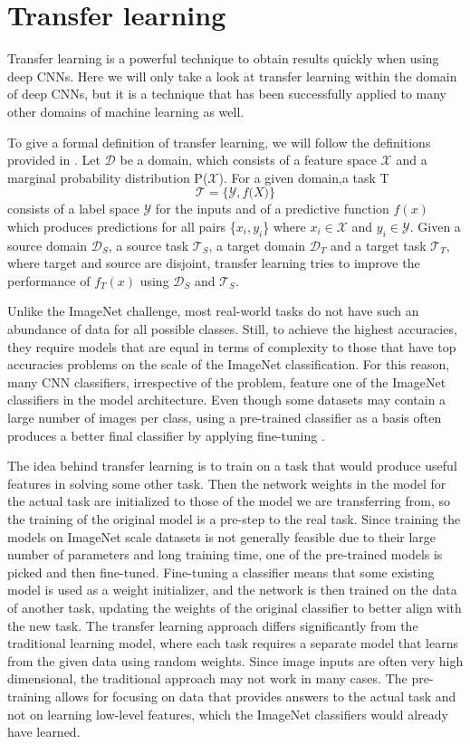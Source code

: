 \section{Transfer learning}
Transfer learning is a powerful technique to obtain results quickly when using deep CNNs. Here we will only take a look at transfer learning within the domain of deep CNNs, but it is a technique that has been successfully applied to many other domains of machine learning as well.

To give a formal definition of transfer learning, we will follow the definitions provided in \citep{transferSurvey2010}.
Let $\mathcal{D}$ be a domain, which consists of a feature space $\mathcal{X}$ and a marginal probability distribution P($\mathcal{X}$).
For a given domain,a task T \[\mathcal{T} = \{\mathcal{Y}, f\mathcal(X)\}\] \noindent consists of a label space $\mathcal{Y}$ for the inputs and of a predictive function $f(x)$ which produces predictions for all pairs \{$x_i, y_i$\} where $x_i \in \mathcal{X}$ and $y_i \in \mathcal{Y}$.
Given a source domain $\mathcal{D}_S$, a source task $\mathcal{T}_S$, a target domain $\mathcal{D}_T$ and a target task $\mathcal{T}_T$, where target and source are disjoint, transfer learning tries to improve the performance of $f_T(x)$ using $\mathcal{D}_S$ and $\mathcal{T}_S$.

Unlike the ImageNet challenge, most real-world tasks do not have such an abundance of data for all possible classes. Still, to achieve the highest accuracies, they require models that are equal in terms of complexity to those that have top accuracies problems on the scale of the ImageNet classification. For this reason, many CNN classifiers, irrespective of the problem, feature one of the ImageNet classifiers in the model architecture. Even though some datasets may contain a large number of images per class, using a pre-trained classifier as a basis often produces a better final classifier by applying fine-tuning \citep{betterTransfer}.

The idea behind transfer learning is to train on a task that would produce useful features in solving some other task.
Then the network weights in the model for the actual task are initialized to those of the model we are transferring from, so the training of the original model is a pre-step to the real task.
Since training the models on ImageNet scale datasets is not generally feasible due to their large number of parameters and long training time, one of the pre-trained models is picked and then fine-tuned.
Fine-tuning a classifier means that some existing model is used as a weight initializer, and the network is then trained on the data of another task, updating the weights of the original classifier to better align with the new task.
The transfer learning approach differs significantly from the traditional learning model, where each task requires a separate model that learns from the given data using random weights.
Since image inputs are often very high dimensional, the traditional approach may not work in many cases.
The pre-training allows for focusing on data that provides answers to the actual task and not on learning low-level features, which the ImageNet classifiers would already have learned.

